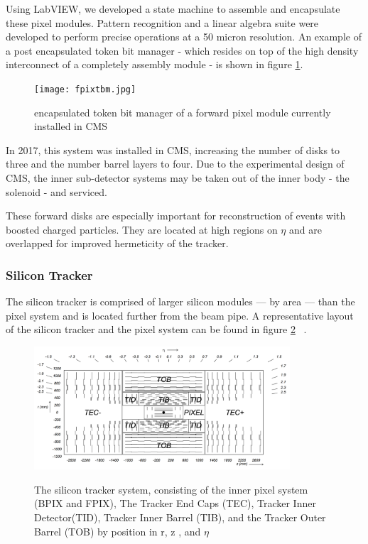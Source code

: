 Using LabVIEW, we developed a state machine to assemble and encapsulate these pixel modules. Pattern recognition and a linear algebra suite were developed to perform precise operations at a 50 micron resolution. An example of a post encapsulated token bit manager - which resides on top of the high density interconnect of a completely assembly module - is shown in figure \ref{fig:tbm}.

\begin{figure}[ht!b]
    \centering
  \texttt{[image: fpixtbm.jpg]}
    \caption{\label{fig:tbm} encapsulated token bit manager of a forward pixel module currently installed in CMS}
\end{figure}


In 2017, this system was installed in CMS, increasing the number of disks to three and the number barrel layers to four.  Due to the experimental design of CMS, the inner sub-detector systems may be taken out of the inner body - the solenoid - and serviced.  

These forward disks are especially important for reconstruction of events with boosted charged particles. They are located at high regions on $\eta$ and are overlapped for improved hermeticity of the tracker.  


\subsubsection{Silicon Tracker}
The silicon tracker is comprised of larger silicon modules --- by area --- than the pixel system and is located further from the beam pipe. A representative layout of the silicon tracker and the pixel system can be found in figure \ref{fig:tracker} ~\cite{Chatrchyan:2008zzk}. 

\begin{figure}[ht!b]
\label{fig:tracker}
  \centering
  \includegraphics[width=0.85\textwidth]{figures/silicon/SiliconTracker.png}\\
    \caption{ The silicon tracker system, consisting of the inner pixel system (BPIX and FPIX), The Tracker End Caps (TEC), Tracker Inner Detector(TID), Tracker Inner Barrel (TIB), and the Tracker Outer Barrel (TOB) by position in r, z , and $\eta$ ~\cite{Chatrchyan:2008zzk}}
\end{figure}



